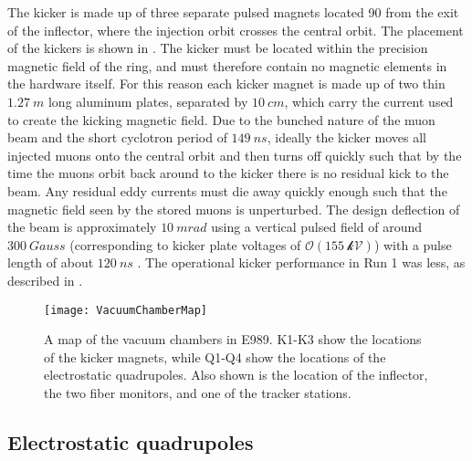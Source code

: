 The kicker is made up of three separate pulsed magnets located 90\textdegree{} from the exit of the inflector, where the injection orbit crosses the central orbit. The placement of the kickers is shown in . The kicker must be located within the precision magnetic field of the ring, and must therefore contain no magnetic elements in the hardware itself. For this reason each kicker magnet is made up of two thin $\SI{1.27}{m}$ long aluminum plates, separated by $\SI{10}{cm}$, which carry the current used to create the kicking magnetic field. Due to the bunched nature of the muon beam and the short cyclotron period of $\SI{149}{ns}$, ideally the kicker moves all injected muons onto the central orbit and then turns off quickly such that by the time the muons orbit back around to the kicker there is no residual kick to the beam. Any residual eddy currents must die away quickly enough such that the magnetic field seen by the stored muons is unperturbed. The design deflection of the beam is approximately $\SI{10}{mrad}$ using a vertical pulsed field of around $\SI{300}{Gauss}$ (corresponding to kicker plate voltages of $\mathcal{O(\SI{155}{kV})}$) with a pulse length of about $\SI{120}{ns}$ \cite{TDR}. The operational kicker performance in Run 1 was less, as described in .



\begin{figure}
    \centering
    \texttt{[image: VacuumChamberMap]}
    \caption[Vacuum chamber map]{A map of the vacuum chambers in E989. K1-K3 show the locations of the kicker magnets, while Q1-Q4 show the locations of the electrostatic quadrupoles. Also shown is the location of the inflector, the two fiber monitors, and one of the tracker stations.}   
    \label{fig:vacmap}
\end{figure}

\subsection{Electrostatic quadrupoles}
\label{sub:quads}

